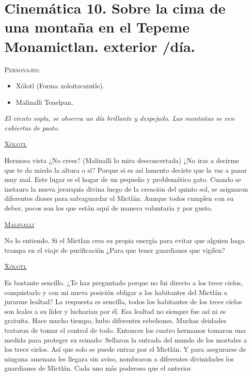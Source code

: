 \section{Cinemática 10. Sobre la cima de una montaña en el Tepeme Monamictlan. exterior /día.}
\label{Cin:Cinematica10}
 \textsc{Personajes}:
 \begin{itemize}
 \item Xólotl (Forma xoloitzcuintle).
	\item Malinalli Tenelpan.
 \end{itemize}
\textit{El viento sopla, se observa un día brillante y despejado.  Las montañas se ven cubiertas de pasto.}

\begin{center}
\textsc{\underline{Xólotl}}
\\
\par
Hermosa vista ¿No crees? (Malinalli lo mira desconcertada) ¿No iras a decirme que te da miedo la altura o sí? Porque si es así lamento decirte que la vas a pasar muy mal. Este lugar es el hogar de un pequeño y problemático gato. Cuando se instauro la nueva jerarquía divina luego de la creación del quinto sol, se asignaron diferentes dioses para salvaguardar el Mictlán. Aunque todos cumplen con su deber, pocos son los que están aquí de manera voluntaria y por gusto.
\\
\par
\textsc{\underline{Malinalli}}
\\
\par
No lo entiendo. Si el Mictlan crea su propia energía para evitar que alguien haga trampa en el viaje de purificación ¿Para que tener guardianes que vigilen?
\\
\par
\textsc{\underline{Xólotl}}
\\
\par
Es bastante sencillo. ¿Te haz preguntado porque no fui directo a los trece cielos, conquistarlo y con mi nueva posición obligar a los habitantes del Mictlán a jurarme lealtad? La respuesta es sencilla, todos los habitantes de los trece cielos son leales a su líder y lucharían por él. Esa lealtad no siempre fue así ni es gratuita. Hace mucho tiempo, hubo diferentes rebeliones. Muchas deidades trataron de tomar el control de todo. Entonces los cuatro hermanos tomaron una medida para proteger su reinado: Sellaron la entrada del mundo de los mortales a los trece cielos. Así que solo se puede entrar por el Mictlán. Y para asegurarse de ninguna amenaza les llegara sin aviso, nombraron a diferentes divinidades los guardianes de Mictlán. Cada uno más poderoso que el anterior. 

\end{center}
